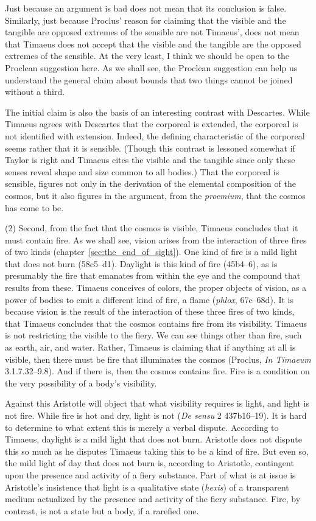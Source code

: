 Just because an argument is bad does not mean that its conclusion is false. Similarly, just because Proclus' reason for claiming that the visible and the tangible are opposed extremes of the sensible are not Timaeus', does not mean that Timaeus does not accept that the visible and the tangible are the opposed extremes of the sensible. At the very least, I think we should be open to the Proclean suggestion here. As we shall see, the Proclean suggestion can help us understand the general claim about bounds that two things cannot be joined without a third.

The initial claim is also the basis of an interesting contrast with Descartes. While Timaeus agrees with Descartes that the corporeal is extended, the corporeal is not identified with extension. Indeed, the defining characteristic of the corporeal seems rather that it is sensible. (Though this contrast is lessoned somewhat if Taylor is right and Timaeus cites the visible and the tangible since only these senses reveal shape and size common to all bodies.) That the corporeal is sensible, figures not only in the derivation of the elemental composition of the cosmos, but it also figures in the argument, from the \emph{proemium}, that the cosmos has come to be.

(2) Second, from the fact that the cosmos is visible, Timaeus concludes that it must contain fire. As we shall see, vision arises from the interaction of three fires of two kinds (chapter~\ref{sec:the_end_of_sight}). One kind of fire is a mild light that does not burn (58c5–d1). Daylight is this kind of fire (45b4–6), as is presumably the fire that emanates from within the eye and the compound that results from these. Timaeus conceives of colors, the proper objects of vision, as a power of bodies to emit a different kind of fire, a flame (\emph{phlox}, 67c–68d). It is because vision is the result of the interaction of these three fires of two kinds, that Timaeus concludes that the cosmos contains fire from its visibility. Timaeus is not restricting the visible to the fiery. We can see things other than fire, such as earth, air, and water. Rather, Timaeus is claiming that if anything at all is visible, then there must be fire that illuminates the cosmos (Proclus, \emph{In Timaeum} 3.1.7.32--9.8). And if there is, then the cosmos contains fire. Fire is a condition on the very possibility of a body's visibility.

Against this Aristotle will object that what visibility requires is light, and light is not fire. While fire is hot and dry, light is not (\emph{De sensu} 2 437b16--19). It is hard to determine to what extent this is merely a verbal dispute. According to Timaeus, daylight is a mild light that does not burn. Aristotle does not dispute this so much as he disputes Timaeus taking this to be a kind of fire. But even so, the mild light of day that does not burn is, according to Aristotle, contingent upon the presence and activity of a fiery substance. Part of what is at issue is Aristotle's insistence that light is a qualitative state (\emph{hexis}) of a transparent medium actualized by the presence and activity of the fiery substance. Fire, by contrast, is not a state but a body, if a rarefied one.

